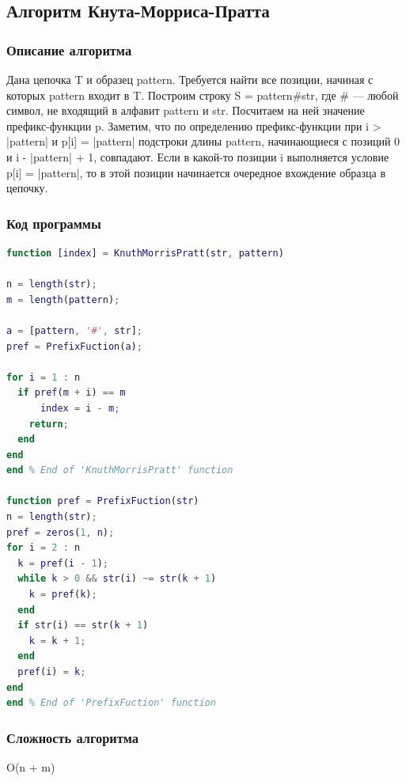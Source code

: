 \documentclass[12pt]{article}
\begin{document}
\subsection{Алгоритм Кнута-Морриса-Пратта}
\subsubsection{Описание алгоритма}
Дана цепочка T и образец pattern. Требуется найти все позиции, начиная с которых pattern входит в T. 
Построим строку S = pattern\#str, где \# — любой символ, не входящий в алфавит pattern и str. Посчитаем на ней значение префикс-функции p. Заметим, что по определению префикс-функции при i > |pattern| и p[i] = |pattern| подстроки длины pattern, начинающиеся с позиций 0 и i - |pattern| + 1, совпадают. Если в какой-то позиции i выполняется условие p[i] = |pattern|, то в этой позиции начинается очередное вхождение образца в цепочку.
\subsubsection{Код программы}
\begin{lstlisting}[language={Matlab}, caption={Алгоритм Рабина-Карпа}, label={Script}]
function [index] = KnuthMorrisPratt(str, pattern)

n = length(str);
m = length(pattern);

a = [pattern, '#', str]; 
pref = PrefixFuction(a);

for i = 1 : n
  if pref(m + i) == m
      index = i - m;
    return;
  end
end
end % End of 'KnuthMorrisPratt' function

function pref = PrefixFuction(str)
n = length(str);
pref = zeros(1, n);
for i = 2 : n
  k = pref(i - 1);
  while k > 0 && str(i) ~= str(k + 1)
    k = pref(k);
  end
  if str(i) == str(k + 1)
    k = k + 1;
  end
  pref(i) = k;
end
end % End of 'PrefixFuction' function
\end{lstlisting}
\subsubsection{Сложность алгоритма}
O(n + m)
\end{document}
